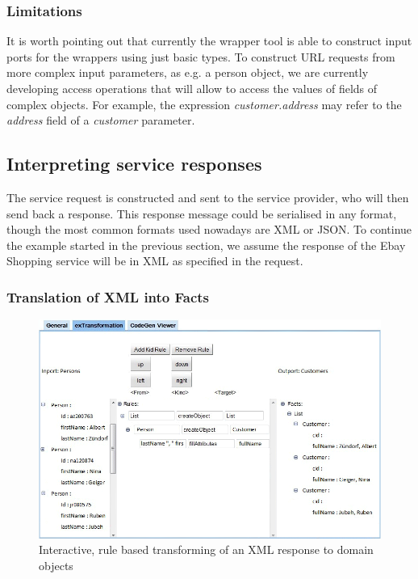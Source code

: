\subsubsection{Limitations} %
\label{ssub:limitations}

It is worth pointing out that currently the wrapper tool is able to construct input ports for the wrappers using just basic types. To construct URL requests from more complex input parameters, as e.g. a person object, we are currently developing access operations that will allow to access the values of fields of complex objects. For example, the expression \emph{customer.address} may refer to the \emph{address} field of a \emph{customer} parameter.  



\subsection{Interpreting service responses} %
\label{sub:interpreting_service_responses}

The service request is constructed and sent to the service provider, who will then send back a response. This response message could be serialised in any format, though the most common formats used nowadays are XML or JSON. To continue the example started in the previous section, we assume the response of the Ebay Shopping service will be in XML as specified in the request.

\subsubsection{Translation of XML into Facts} %
\label{ssub:translation_xml_into_facts}

\begin{figure}
  \begin{center}
    \includegraphics[width=\linewidth]{images/ServiceWrapperToolGVSWithTransformationRules.png}
    \caption{Interactive, rule based transforming of an XML response to domain objects}
    \label{fig:response_service_execution}
  \end{center}
\end{figure}


